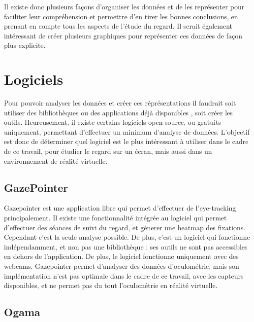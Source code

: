 \documentclass[12pt]{article}
\begin{document}
\bigskip
Il existe donc plusieurs façons d'organiser les données et de les représenter
pour faciliter leur compréhension et permettre d'en tirer les bonnes
conclusions, en prenant en compte tous les aspects de l'étude du regard. Il
serait également intéressant de créer plusieurs graphiques pour représenter ces
données de façon plus explicite.


\section{Logiciels}

Pour pouvoir analyser les données et créer ces réprésentations il faudrait soit
utiliser des bibliothèques ou des applications déjà disponibles
\cite{imotions:software}, soit créer les outils. Heureusement, il existe
certains logiciels open-source, ou gratuits uniquement, permettant d'effectuer
un minimum d'analyse de données. L'objectif est donc de déterminer quel
logiciel est le plus intéressant à utiliser dans le cadre de ce travail,
pour étudier le regard sur un écran, mais aussi dans un environnement de
réalité virtuelle.

\subsection{GazePointer}

Gazepointer \cite{gazepointer} est une application libre qui permet d'effectuer
de l'eye-tracking principalement. Il existe une fonctionnalité intégrée au
logiciel qui permet d'effectuer des séances de suivi du regard, et génerer une
heatmap des fixations. Cependant c'est la seule analyse possible. De plus,
c'est un logiciel qui fonctionne indépendamment, et non pas une bibliothèque :
ses outils ne sont pas accessibles en dehors de l'application. De plus, le
logiciel fonctionne uniquement avec des webcams. Gazepointer permet d'analyser
des données d'oculométrie, mais son implémentation n'est pas optimale dans le
cadre de ce travail, avec les capteurs disponibles, et ne permet pas du tout
l'oculométrie en réalité virtuelle.

\subsection{Ogama}
\end{document}

